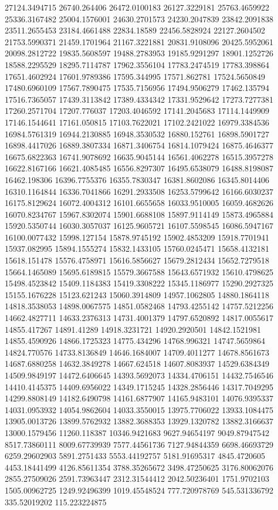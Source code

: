 \documentclass[draft=on]{scrbook}
\begin{document}
\begin{minipage}{.5\textwidth}
27124.3494715
26740.264406
26472.0100183
26127.3229181
25763.4659922
25336.3167482
25004.1576001
24630.2701573
24230.2047839
23842.2091838
23511.2655453
23184.4661488
22834.18589
22456.5828924
22127.2604502
21753.5990371
21459.1701964
21167.3221881
20831.9108096
20425.5952061
20098.2812722
19835.5608597
19488.2783953
19185.9291297
18901.1252726
18588.2295529
18295.7114787
17962.3556104
17783.2474519
17783.398864
17651.4602924
17601.9789386
17595.344995
17571.862781
17524.5650849
17480.6960109
17567.7890475
17535.7156956
17494.9506279
17462.135794
17516.7365057
17439.3113842
17389.4334342
17331.9529642
17273.7277381
17260.2571704
17207.776037
17203.4046592
17141.2045683
17114.1449909
17146.1544641
17161.050815
17103.7622021
17102.2421022
16979.3384536
16984.5761319
16944.2130885
16948.3530532
16880.152761
16898.5901727
16898.4417026
16889.3807334
16871.3406754
16814.1079424
16875.4646377
16675.6822363
16741.9078692
16635.9045144
16561.4062278
16515.3957278
16622.8167166
16621.4085485
16556.8297307
16495.6538079
16488.8198087
16462.198306
16396.7755376
16355.7830347
16381.8602086
16345.8014406
16310.1164844
16336.7041866
16291.2933508
16253.5799642
16166.6030237
16175.8129624
16072.4004312
16101.6655658
16033.9510005
16059.4682626
16070.8234767
15967.8302074
15901.6688108
15897.9114149
15873.4965884
15920.5350744
16030.3057037
16125.9605721
16107.5598545
16086.5947167
16100.0077432
15998.127154
15878.9745192
15902.4853209
15918.7701941
15937.082995
15894.1555274
15832.1433105
15760.0245471
15658.4132181
15618.151478
15576.4758971
15616.5856627
15679.2812434
15652.7279518
15664.1465089
15695.6189815
15579.3667588
15643.6571932
15610.4798625
15498.4523842
15409.1184383
15419.3308222
15345.1186977
15290.2927325
15155.1676228
15123.621243
15060.3914809
14957.1062805
14880.1864118
14818.3538053
14898.0067575
14851.0582468
14793.4255142
14757.5212256
14662.4827711
14633.2376313
14731.4001379
14797.6520892
14817.0055617
14855.417267
14891.41289
14918.3231721
14920.2920501
14842.1521981
14855.4590926
14866.1725323
14775.434296
14768.996321
14747.5659864
14824.770576
14733.8136849
14646.1684007
14709.4011277
14678.8561673
14687.6880258
14632.3849278
14667.624518
14607.8083937
14529.6384349
14509.9849197
14472.6406645
14393.5692073
14334.4706151
14432.7546546
14410.4145375
14409.6956022
14349.1715245
14328.2856446
14317.7049295
14299.8808149
14182.6490798
14161.6877907
14165.9483101
14076.9395337
14031.0953932
14054.9862604
14033.3550015
13975.7706022
13933.1084475
13905.0013726
13899.5762932
13882.3688353
13929.1320782
13882.3166637
13000.1579456
11260.118387
10346.9421683
9627.94654197
9049.87947542
8517.73860111
8009.67739939
7577.44561736
7127.94844359
6698.46693729
6259.29602903
5891.2751433
5553.44192757
5181.91695317
4845.4720605
4453.18441499
4126.85611354
3788.35265672
3498.47250625
3176.80062076
2855.27509026
2591.73963447
2312.31544412
2042.50236401
1751.9702103
1505.00962725
1249.92496399
1019.45548524
777.720978769
545.531336792
335.52019202
115.223224875

\end{minipage}
\end{document}
